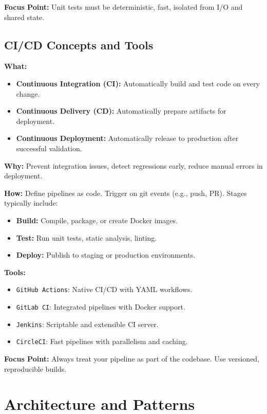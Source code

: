 \documentclass[a4paper,12pt]{article}
\begin{document}
\textbf{Focus Point:} Unit tests must be deterministic, fast, isolated from I/O and shared state.

\subsection{CI/CD Concepts and Tools}

\textbf{What:}
\begin{itemize}
  \item \textbf{Continuous Integration (CI):} Automatically build and test code on every change.
  \item \textbf{Continuous Delivery (CD):} Automatically prepare artifacts for deployment.
  \item \textbf{Continuous Deployment:} Automatically release to production after successful validation.
\end{itemize}

\textbf{Why:} Prevent integration issues, detect regressions early, reduce manual errors in deployment.

\textbf{How:} Define pipelines as code. Trigger on git events (e.g., push, PR). Stages typically include:

\begin{itemize}
  \item \textbf{Build:} Compile, package, or create Docker images.
  \item \textbf{Test:} Run unit tests, static analysis, linting.
  \item \textbf{Deploy:} Publish to staging or production environments.
\end{itemize}

\textbf{Tools:}
\begin{itemize}
  \item \texttt{GitHub Actions}: Native CI/CD with YAML workflows.
  \item \texttt{GitLab CI}: Integrated pipelines with Docker support.
  \item \texttt{Jenkins}: Scriptable and extensible CI server.
  \item \texttt{CircleCI}: Fast pipelines with parallelism and caching.
\end{itemize}

\textbf{Focus Point:} Always treat your pipeline as part of the codebase. Use versioned, reproducible builds.


\section{Architecture and Patterns}
\end{document}
